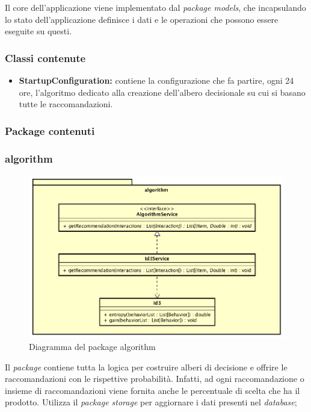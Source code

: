 \newpage
Il core dell'applicazione viene implementato dal \textit{package models}, che incapsulando lo stato dell'applicazione definisce i dati e le operazioni che possono essere eseguite su questi.

\subsubsection*{Classi contenute}
\begin{itemize}
	\item \textbf{StartupConfiguration:} contiene la configurazione che fa partire, ogni 24 ore, l'algoritmo dedicato alla creazione dell'albero decisionale su cui si basano tutte le raccomandazioni.
\end{itemize}

\subsubsection*{Package contenuti}
	
	\subsubsection*{algorithm}
	\begin{figure}[h]
	\centering
	\includegraphics[width=0.8\linewidth]{immagini/tres-algorithm}
	\caption[Diagramma del package algorithm]{Diagramma del package algorithm}
	\label{fig:tres-algorithm}
	\end{figure}
	Il \textit{package} contiene tutta la logica per costruire alberi di decisione e offrire le raccomandazioni con le rispettive probabilità. Infatti, ad ogni raccomandazione o insieme di raccomandazioni viene fornita anche le percentuale di scelta che ha il prodotto. Utilizza il \textit{package storage} per aggiornare i dati presenti nel \textit{database};
	
